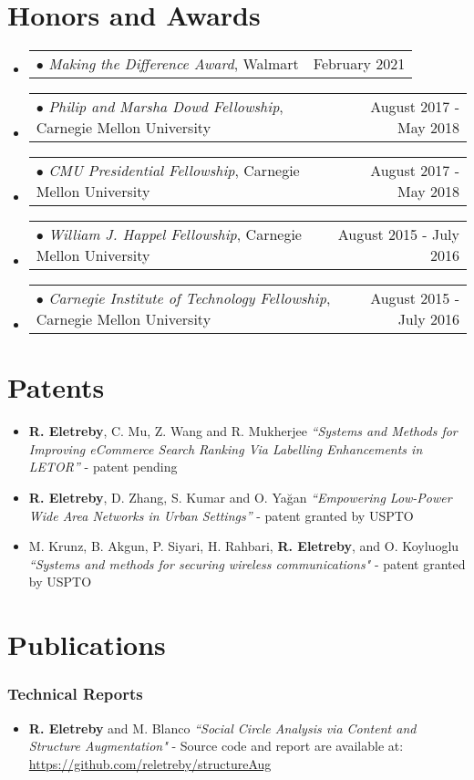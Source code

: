 \documentclass[letterpaper,11pt]{article}
\makeatletter
\newcommand{\resumeItem}[1]{
  \item\small{
    {#1 \vspace{-2pt}}
  }
}
\newcommand{\resumeItemInfo}[2]{
  \item[#1]\small{
    {#2 \vspace{-2pt}}
  }
}
\newcommand{\resumeSubheadingSmall}[2]{
  \item
    \begin{tabular*}{0.97\textwidth}[t]{l@{\extracolsep{\fill}}r}
      \small #1 & \small #2 \\
    \end{tabular*}
}
\newcommand{\resumeSubHeadingListStart}{\begin{itemize}[leftmargin=0.15in, label={}]}
\newcommand{\resumeSubHeadingListEnd}{\end{itemize}}
\newcommand{\resumeItemListStart}{\begin{itemize}}
\newcommand{\resumeItemListEnd}{\end{itemize}\vspace{-4.5pt}}
\makeatother
\begin{document}
   


\section{Honors and Awards}
{\renewcommand{\arraystretch}{-3}
  \resumeSubHeadingListStart
  \resumeSubheadingSmall{$\bullet$ {\em Making the Difference Award}, Walmart}{February 2021}
  \resumeSubheadingSmall{$\bullet$ {\em Philip and Marsha Dowd Fellowship}, Carnegie Mellon University}{August 2017 - May 2018}
  \resumeSubheadingSmall{$\bullet$ {\em CMU Presidential Fellowship}, Carnegie Mellon University}{August 2017 - May 2018}
  \resumeSubheadingSmall{$\bullet$ {\em William J. Happel Fellowship}, Carnegie Mellon University}{August 2015 - July 2016}
  \resumeSubheadingSmall{$\bullet$ {\em Carnegie Institute of Technology Fellowship}, Carnegie Mellon University}{August 2015 - July 2016}
    \resumeSubHeadingListEnd
  }


\section{Patents}
\resumeItemListStart

\resumeItemInfo{(P3)}{\textbf{R. Eletreby}, C. Mu, Z. Wang and R. Mukherjee \textit{``Systems and Methods for Improving eCommerce Search Ranking Via Labelling Enhancements in LETOR”} - patent pending}
\resumeItemInfo{(P2)}{\textbf{R. Eletreby}, D. Zhang, S. Kumar and O. Ya\u{g}an \textit{``Empowering Low-Power Wide Area Networks in Urban Settings”} - patent granted by USPTO}
\resumeItemInfo{(P1)}{M. Krunz, B. Akgun, P. Siyari, H. Rahbari, \textbf{R. Eletreby}, and O. Koyluoglu \textit{``Systems and methods for securing wireless communications"} - patent granted by USPTO}
\resumeItemListEnd


\section{Publications}

\subsubsection*{\quad \large Technical Reports}
\resumeItemListStart
\resumeItemInfo{(T1)}{\textbf{R. Eletreby} and  M. Blanco \textit{``Social Circle Analysis via Content and Structure Augmentation"} - Source code and report are available at: \url{https://github.com/reletreby/structureAug}}
\resumeItemListEnd
\end{document}
